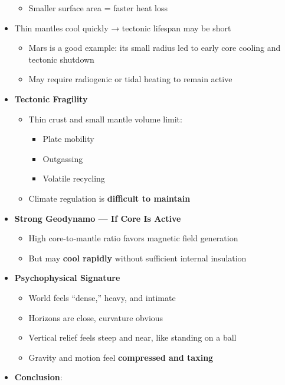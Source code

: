 \documentclass[
  letterpaper,
]{book}
\providecommand{\tightlist}{%
  \setlength{\itemsep}{0pt}\setlength{\parskip}{0pt}}
\begin{document}
\begin{itemize}
  \begin{itemize}
  \tightlist
  \item
    Smaller surface area = faster heat loss
  \end{itemize}
\item
  Thin mantles cool quickly → tectonic lifespan may be short

  \begin{itemize}
  \tightlist
  \item
    Mars is a good example: its small radius led to early core cooling
    and tectonic shutdown
  \item
    May require radiogenic or tidal heating to remain active
  \end{itemize}
\item
  \textbf{Tectonic Fragility}

  \begin{itemize}
  \tightlist
  \item
    Thin crust and small mantle volume limit:

    \begin{itemize}
    \tightlist
    \item
      Plate mobility
    \item
      Outgassing
    \item
      Volatile recycling
    \end{itemize}
  \item
    Climate regulation is \textbf{difficult to maintain}
  \end{itemize}
\item
  \textbf{Strong Geodynamo --- If Core Is Active}

  \begin{itemize}
  \tightlist
  \item
    High core-to-mantle ratio favors magnetic field generation
  \item
    But may \textbf{cool rapidly} without sufficient internal insulation
  \end{itemize}
\item
  \textbf{Psychophysical Signature}

  \begin{itemize}
  \tightlist
  \item
    World feels ``dense,'' heavy, and intimate
  \item
    Horizons are close, curvature obvious
  \item
    Vertical relief feels steep and near, like standing on a ball
  \item
    Gravity and motion feel \textbf{compressed and taxing}
  \end{itemize}
\item
  \textbf{Conclusion}:


\end{itemize}
\end{document}
